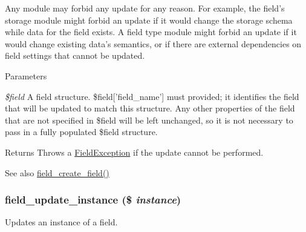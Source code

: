 Any module may forbid any update for any reason. For example, the field's storage module might forbid an update if it would change the storage schema while data for the field exists. A field type module might forbid an update if it would change existing data's semantics, or if there are external dependencies on field settings that cannot be updated.


\begin{DoxyParams}{Parameters}
\item[{\em \$field}]A field structure. \$field\mbox{[}'field\_\-name'\mbox{]} must provided; it identifies the field that will be updated to match this structure. Any other properties of the field that are not specified in \$field will be left unchanged, so it is not necessary to pass in a fully populated \$field structure. \end{DoxyParams}
\begin{DoxyReturn}{Returns}
Throws a \hyperlink{classFieldException}{FieldException} if the update cannot be performed. 
\end{DoxyReturn}
\begin{DoxySeeAlso}{See also}
\hyperlink{group__field__crud_ga0f879889d2da2b5d638252d7eb027746}{field\_\-create\_\-field()} 
\end{DoxySeeAlso}
\hypertarget{group__field__crud_ga34a5c5247a19f6732f71aa1d67c1709d}{
\subsubsection[{field\_\-update\_\-instance}]{\setlength{\rightskip}{0pt plus 5cm}field\_\-update\_\-instance (\$ {\em instance})}}
\label{group__field__crud_ga34a5c5247a19f6732f71aa1d67c1709d}
Updates an instance of a field.


